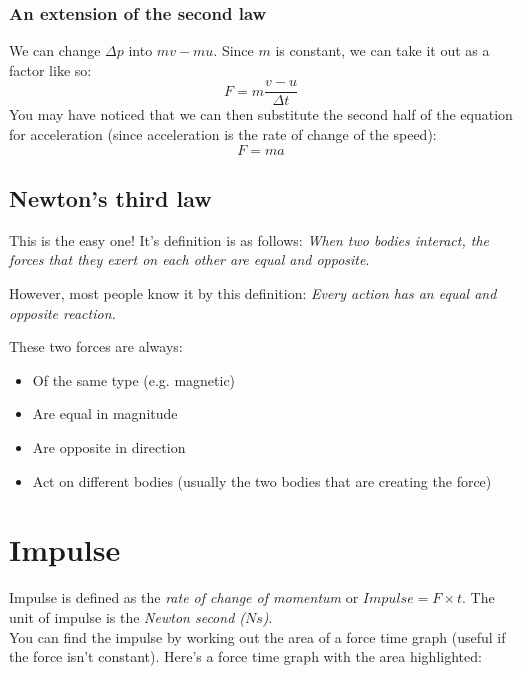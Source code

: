\documentclass{article}
\begin{document}
\subsubsection*{An extension of the second law}
We can change $\Delta p$ into $mv - mu$. Since $m$ is constant, we can take it
out as a factor like so:
\[
	F = m\frac{v - u}{\Delta t}
\]
You may have noticed that we can then substitute the second half of the equation
for acceleration (since acceleration is the rate of change of the speed):
\[
	F = ma
\]
\subsection*{Newton's third law}
This is the easy one! It's definition is as follows: \textit{When two bodies
interact, the forces that they exert on each other are equal and opposite}.

However, most people know it by this definition: \textit{Every action has an
equal and opposite reaction.}

These two forces are always:
\begin{itemize}
	\item Of the same type (e.g. magnetic)
	\item Are equal in magnitude
	\item Are opposite in direction
	\item Act on different bodies (usually the two bodies that are creating the
	force)
\end{itemize}

\section*{Impulse}
Impulse is defined as the \textit{rate of change of momentum} or $Impulse = F
\times t$. The unit of impulse is the \textit{Newton second ($Ns$)}.\\
You can find the impulse by working out the area of a force time graph (useful
if the force isn't constant). Here's a force time graph with the area
highlighted:
\begin{center}
\end{center}
\end{document}
